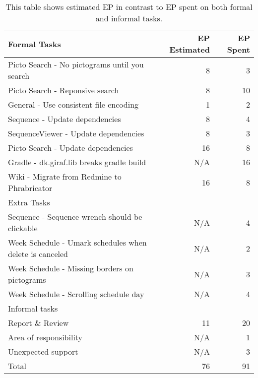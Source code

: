 \begin{table}[h]
    {\setlength{\extrarowheight}{1ex}%
    \begin{tabularx}{\textwidth}{X|r|r}
        \toprule
        Formal Tasks                                                  & EP Estimated & EP Spent     \\
        \midrule
        Picto Search - No pictograms until you search                 & 8            & 3            \\
        Picto Search - Reponsive search                               & 8            & 10           \\
        General - Use consistent file encoding                        & 1            & 2            \\
        Sequence - Update dependencies                                & 8            & 4            \\
        SequenceViewer - Update dependencies                          & 8            & 3            \\
        Picto Search - Update dependencies                            & 16           & 8            \\
        Gradle - dk.giraf.lib breaks gradle build                     & N/A          & 16           \\
        Wiki - Migrate from Redmine to Phrabricator                   & 16           & 8            \\
        \toprule
        Extra Tasks                                                   &              &              \\
        \midrule
        Sequence - Sequence wrench should be clickable                & N/A          & 4            \\
        Week Schedule - Umark schedules when delete is canceled       & N/A          & 2            \\
        Week Schedule - Missing borders on pictograms                 & N/A          & 3            \\
        Week Schedule - Scrolling schedule day                        & N/A          & 4            \\
        \toprule
        Informal tasks                                                &              &              \\
        \midrule
        Report \& Review                                              & 11           & 20           \\      %
        Area of responsibility                                        & N/A          & 1            \\
        Unexpected support                                            & N/A          & 3            \\
        \midrule
        Total                                                         & 76           & 91           \\
        \bottomrule
    \end{tabularx}}
    \caption{This table shows estimated EP in contrast to EP spent on both formal and informal tasks.}
    \label{tab:sprint1tasktable}
\end{table}
